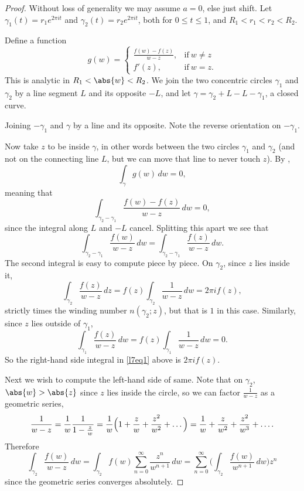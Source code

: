 \begin{proof}
	Without loss of generality we may assume $a = 0$, else just shift.
	Let $\gamma_1(t) = r_1 e^{2 \pi i t}$ and $\gamma_2(t) = r_2 e^{2 \pi i t}$, both for $0 \leq t \leq 1$, and $R_1 < r_1 < r_2 < R_2$.

	Define a function
	\[
		g(w) = \begin{cases}
			\frac{f(w) - f(z)}{w - z}, & \text{if}~ w \neq z \\
			f'(z), & \text{if}~ w = z.
		\end{cases}
	\]
	This is analytic in $R_1 < \abs{w} < R_2$.
	We join the two concentric circles $\gamma_1$ and $\gamma_2$ by a line segment $L$ and its opposite $-L$, and let $\gamma = \gamma_2 + L - L - \gamma_1$, a closed curve.

	\begin{marginfigure}
		\caption{\label{thm53:fig} Joining $-\gamma_1$ and $\gamma$ by a line and its opposite.
		Note the reverse orientation on $-\gamma_1$.}
	\end{marginfigure}

	Now take $z$ to be inside $\gamma$, in other words between the two circles $\gamma_1$ and $\gamma_2$ (and not on the connecting line $L$, but we can move that line to never touch $z$).
	By ,
	\[
		\int_\gamma g(w) \, d w = 0,
	\]
	meaning that
	\[
		\int_{\gamma_2 - \gamma_1} \frac{f(w) - f(z)}{w - z} \, d w = 0,
	\]
	since the integral along $L$ and $-L$ cancel.
	Splitting this apart we see that
	\begin{equation}\label{l7eq1}
		\int_{\gamma_2 - \gamma_1} \frac{f(w)}{w - z} \, d w = \int_{\gamma_2 -\gamma_1} \frac{f(z)}{w - z} \, d w.
	\end{equation}
	The second integral is easy to compute piece by piece.
	On $\gamma_2$, since $z$ lies inside it,
	\[
		\int_{\gamma_2} \frac{f(z)}{w - z} \, d z = f(z) \int_{\gamma_2} \frac{1}{w - z} \, d w = 2 \pi i f(z),
	\]
	strictly times the winding number $n(\gamma_2; z)$, but that is $1$ in this case.
	Similarly, since $z$ lies outside of $\gamma_1$,
	\[
		\int_{\gamma_1} \frac{f(z)}{w - z} \, d w = f(z) \int_{\gamma_1} \frac{1}{w - z} \, d w = 0.
	\]
	So the right-hand side integral in \autoref{l7eq1} above is $2 \pi i f(z)$.

	Next we wish to compute the left-hand side of same.
	Note that on $\gamma_2$, $\abs{w} > \abs{z}$ since $z$ lies inside the circle, so we can factor $\frac{1}{w - z}$ as a geometric series,
	\[
		\frac{1}{w - z} = \frac{1}{w} \frac{1}{1 -\frac{z}{w}} = \frac{1}{w} \Bigl ( 1 + \frac{z}{w} + \frac{z^2}{w^2} + \dots \Bigr ) = \frac{1}{w} + \frac{z}{w^2} + \frac{z^2}{w^3} + \dots.
	\]
	Therefore
	\[
		\int_{\gamma_2} \frac{f(w)}{w - z} \, d w = \int_{\gamma_2} f(w) \sum_{n = 0}^\infty \frac{z^n}{w^{n + 1}} \, d w = \sum_{n = 0}^\infty \biggl ( \int_{\gamma_2} \frac{f(w)}{w^{n + 1}} \, d w \biggr ) z^n
	\]
	since the geometric series converges absolutely.


\end{proof}
